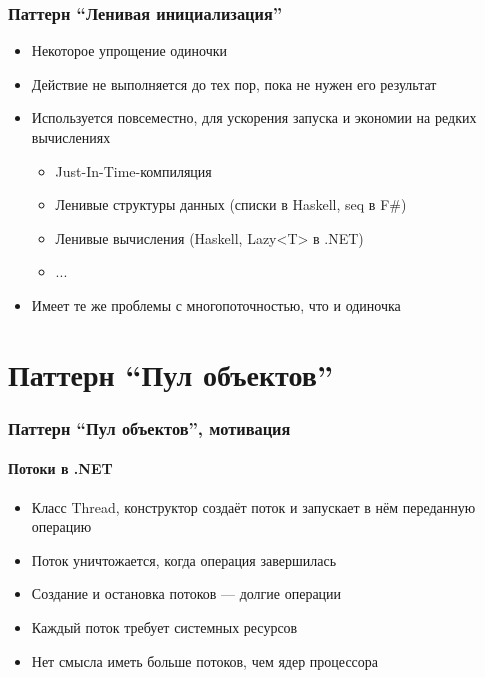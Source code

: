 \documentclass[xetex,mathserif,serif]{beamer}
\begin{document}
	\begin{frame}
		\frametitle{Паттерн ``Ленивая инициализация''}
		\begin{itemize}
			\item Некоторое упрощение одиночки
			\item Действие не выполняется до тех пор, пока не нужен его результат
			\item Используется повсеместно, для ускорения запуска и экономии на редких вычислениях
			\begin{itemize}
				\item Just-In-Time-компиляция
				\item Ленивые структуры данных (списки в Haskell, seq в F\#)
				\item Ленивые вычисления (Haskell, Lazy<T> в .NET)
				\item ...
			\end{itemize}
			\item Имеет те же проблемы с многопоточностью, что и одиночка
		\end{itemize}
	\end{frame}

	\section{Паттерн ``Пул объектов''}

	\begin{frame}
		\frametitle{Паттерн ``Пул объектов'', мотивация}
		\framesubtitle{Потоки в .NET}
		\begin{itemize}
			\item Класс Thread, конструктор создаёт поток и запускает в нём переданную операцию
			\item Поток уничтожается, когда операция завершилась
			\item Создание и остановка потоков --- долгие операции
			\item Каждый поток требует системных ресурсов
			\item Нет смысла иметь больше потоков, чем ядер процессора
		\end{itemize}
	\end{frame}
\end{document}
